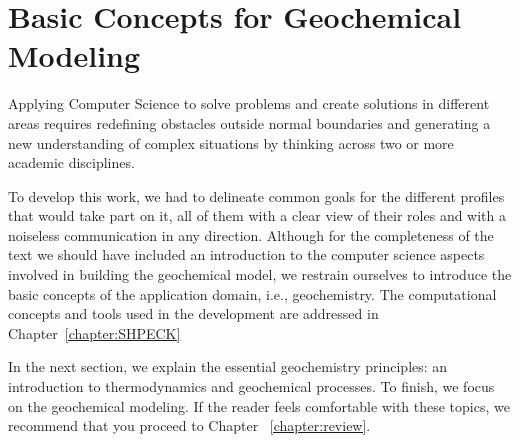 \chapter{Basic Concepts for Geochemical Modeling}
\label{chapter:basic}

Applying Computer Science to solve problems and create solutions in different areas requires redefining obstacles outside normal boundaries and generating a new understanding of complex situations by thinking across two or more academic disciplines. 

To develop this work, we had to delineate common goals for the different profiles that would take part on it, all of them with a clear view of their roles and with a noiseless communication in any direction. Although for the completeness of the text we should have included an introduction to the computer science aspects involved in building the geochemical model, we restrain ourselves to introduce the basic concepts of the application domain, i.e., geochemistry. The computational concepts and tools used in the development are addressed in Chapter~\ref{chapter:SHPECK}

In the next section, we explain the essential geochemistry principles: an introduction to thermodynamics and geochemical processes. To finish, we focus on the geochemical modeling. If the reader feels comfortable with these topics, we recommend that you proceed to Chapter ~\ref{chapter:review}.


